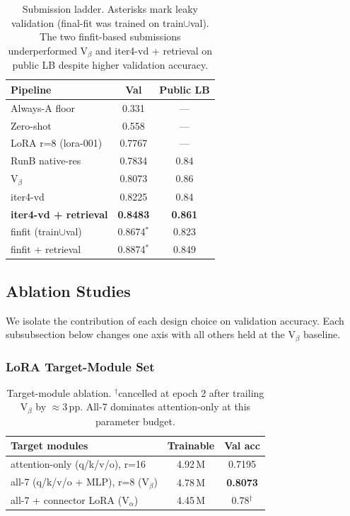 \documentclass[11pt]{article}
\begin{document}
\begin{table}[t]
\small
\begin{tabular}{@{}lcc@{}}
\toprule
\textbf{Pipeline} & \textbf{Val} & \textbf{Public LB} \\
\midrule
Always-A floor & 0.331 & --- \\
Zero-shot & 0.558 & --- \\
LoRA r=8 (lora-001) & 0.7767 & --- \\
RunB native-res & 0.7834 & 0.84 \\
V$_\beta$ & 0.8073 & 0.86 \\
iter4-vd & 0.8225 & 0.84 \\
\textbf{iter4-vd + retrieval} & \textbf{0.8483} & \textbf{0.861} \\
finfit (train$\cup$val) & 0.8674$^*$ & 0.823 \\
finfit + retrieval & 0.8874$^*$ & 0.849 \\
\bottomrule
\end{tabular}
\caption{Submission ladder. Asterisks mark leaky validation (final-fit was trained on train$\cup$val). The two finfit-based submissions underperformed V$_\beta$ and iter4-vd + retrieval on public LB despite higher validation accuracy.}
\label{tab:overall}
\end{table}

\subsection{Ablation Studies}

We isolate the contribution of each design choice on validation accuracy. Each subsubsection below changes one axis with all others held at the V$_\beta$ baseline.

\subsubsection{LoRA Target-Module Set}

\begin{table}[t]
\small
\begin{tabular}{@{}lcc@{}}
\toprule
\textbf{Target modules} & \textbf{Trainable} & \textbf{Val acc} \\
\midrule
attention-only (q/k/v/o), r=16 & 4.92\,M & 0.7195 \\
all-7 (q/k/v/o + MLP), r=8 (V$_\beta$) & 4.78\,M & \textbf{0.8073} \\
all-7 + connector LoRA (V$_\alpha$) & 4.45\,M & 0.78$^\dagger$ \\
\bottomrule
\end{tabular}
\caption{Target-module ablation. $^\dagger$cancelled at epoch 2 after trailing V$_\beta$ by $\approx$3\,pp. All-7 dominates attention-only at this parameter budget.}
\label{tab:target-modules}
\end{table}
\end{document}
